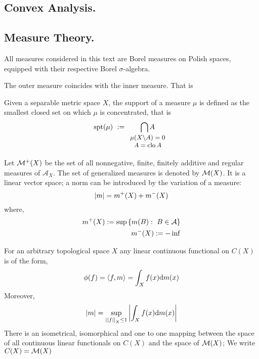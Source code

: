 \subsection{Convex Analysis.}

\subsection{Measure Theory.}
All measures considered in this text are Borel measures on Polish spaces, equipped with
their respective Borel $\sigma$-algebra.
\cite{Milan2000TpicsWeakconvProbs}
\begin{theorem}
	The outer measure coincides with the inner measure. That is 
\end{theorem}
\begin{definition}
	Given a separable metric space $X$, the support of a measure $\mu$ is defined as the smallest closed set on which $\mu$ is concentrated, that is
	\begin{equation}
	\spt(\mu)\ :=\underset{\small{\begin{array}{c}
			\mu(X\backslash A)=0\\ A=\closu A  \end{array}}}{\bigcap A} 		
	\end{equation} 
\end{definition}

Let $\mathcal{M}^+(X)$ be the set of all nonnegative, finite, finitely additive and regular measures of $\mathcal{A}_X$. The set of generalized measures is denoted by $\mathcal{M}(X)$.  It is a linear vector space; a norm can be introduced by the variation of a measure:
\begin{equation}
	\left| m \right|=m^+(X)+m^-(X)
\end{equation}
where, 
\begin{align*}
	m^+(X):=\sup\left\lbrace m(B):\ B \in \mathcal{A} \right\rbrace \\
	m^-(X):=-\inf
\end{align*}
\begin{theorem}[Aleksandrov]
	For an arbitrary topological space $X$ any linear continuous functional on $C(X)$ is of the form,
	\begin{equation}
		\phi(f)=\left\langle f,m \right\rangle=\int_{X}f(x)\mathrm{d} m(x)
	\end{equation}
	Moreover,
	\begin{equation}
		\left| m \right|=\sup_{\left|\left|f\right|\right|_X\leq 1}\left| \int_{X}f(x)\mathrm{d} m(x) \right|
	\end{equation}
	There is an isometrical, isomorphical and one to one mapping between the space of all continuous linear functionals on $C(X)$ and the space of $\mathcal{M}(X)$; We write $C(X)=\mathcal{M}(X)$
\end{theorem}

